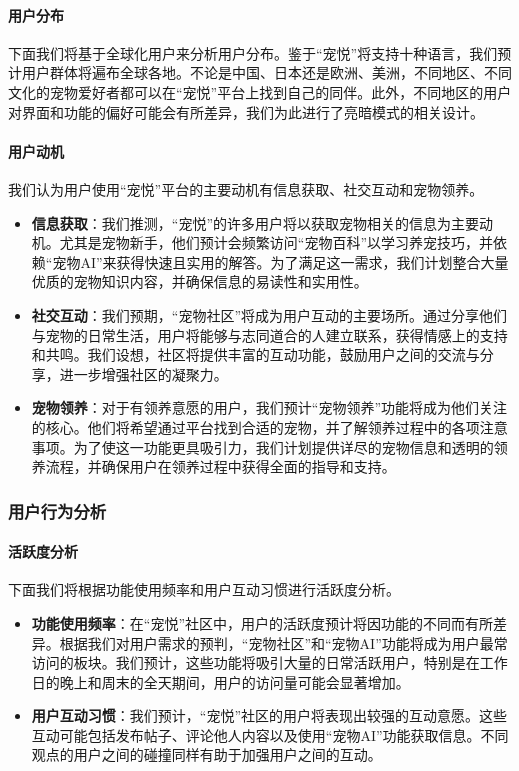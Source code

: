 \paragraph{用户分布}

下面我们将基于全球化用户来分析用户分布。鉴于“宠悦”将支持十种语言，我们预计用户群体将遍布全球各地。不论是中国、日本还是欧洲、美洲，不同地区、不同文化的宠物爱好者都可以在“宠悦”平台上找到自己的同伴。此外，不同地区的用户对界面和功能的偏好可能会有所差异，我们为此进行了亮暗模式的相关设计。

\paragraph{用户动机}

我们认为用户使用“宠悦”平台的主要动机有信息获取、社交互动和宠物领养。

\begin{itemize}
	\item \textbf{信息获取}：我们推测，“宠悦”的许多用户将以获取宠物相关的信息为主要动机。尤其是宠物新手，他们预计会频繁访问“宠物百科”以学习养宠技巧，并依赖“宠物AI”来获得快速且实用的解答。为了满足这一需求，我们计划整合大量优质的宠物知识内容，并确保信息的易读性和实用性。
	\item \textbf{社交互动}：我们预期，“宠物社区”将成为用户互动的主要场所。通过分享他们与宠物的日常生活，用户将能够与志同道合的人建立联系，获得情感上的支持和共鸣。我们设想，社区将提供丰富的互动功能，鼓励用户之间的交流与分享，进一步增强社区的凝聚力。
	\item \textbf{宠物领养}：对于有领养意愿的用户，我们预计“宠物领养”功能将成为他们关注的核心。他们将希望通过平台找到合适的宠物，并了解领养过程中的各项注意事项。为了使这一功能更具吸引力，我们计划提供详尽的宠物信息和透明的领养流程，并确保用户在领养过程中获得全面的指导和支持。
\end{itemize}

\subsubsection{用户行为分析}

\paragraph{活跃度分析}

下面我们将根据功能使用频率和用户互动习惯进行活跃度分析。

\begin{itemize}
	\item \textbf{功能使用频率}：在“宠悦”社区中，用户的活跃度预计将因功能的不同而有所差异。根据我们对用户需求的预判，“宠物社区”和“宠物AI”功能将成为用户最常访问的板块。我们预计，这些功能将吸引大量的日常活跃用户，特别是在工作日的晚上和周末的全天期间，用户的访问量可能会显著增加。
	\item \textbf{用户互动习惯}：我们预计，“宠悦”社区的用户将表现出较强的互动意愿。这些互动可能包括发布帖子、评论他人内容以及使用“宠物AI”功能获取信息。不同观点的用户之间的碰撞同样有助于加强用户之间的互动。
\end{itemize}

